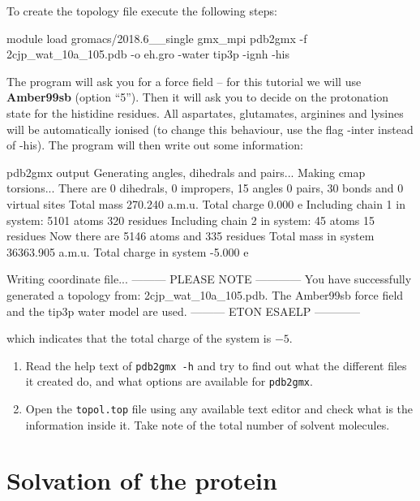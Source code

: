\documentclass[10pt]{article}
\begin{document}
To create the topology file execute the following steps:

\begin{cmdline}
module load gromacs/2018.6__single
gmx_mpi pdb2gmx -f 2cjp_wat_10a_105.pdb -o eh.gro -water tip3p -ignh -his 
\end{cmdline}

The program will ask you for a force field -- for this tutorial we will use \textbf{Amber99sb} (option ``5''). Then it will ask you to decide on the protonation state for the histidine residues. All aspartates, glutamates, arginines and lysines will be automatically ionised (to change this behaviour, use the flag -inter instead of -his). The program will then write out some information:

\begin{script}{pdb2gmx output}
Generating angles, dihedrals and pairs...
Making cmap torsions...
There are    0 dihedrals,    0 impropers,   15 angles
             0 pairs,       30 bonds and     0 virtual sites
Total mass 270.240 a.m.u.
Total charge 0.000 e
Including chain 1 in system: 5101 atoms 320 residues
Including chain 2 in system: 45 atoms 15 residues
Now there are 5146 atoms and 335 residues
Total mass in system 36363.905 a.m.u.
Total charge in system -5.000 e

Writing coordinate file...
		--------- PLEASE NOTE ------------
You have successfully generated a topology from: 2cjp_wat_10a_105.pdb.
The Amber99sb force field and the tip3p water model are used.
		--------- ETON ESAELP ------------
\end{script}

which indicates that the total charge of the system is \(-5\).

\begin{question} 
    \begin{enumerate}[leftmargin=0.6cm]
        \renewcommand{\labelenumi}{Q\arabic{enumi}.}
        \setcounter{enumi}{4}
        \item Read the help text of \texttt{pdb2gmx -h} and try to find out what the different files it created do, and what options are available for \texttt{pdb2gmx}. 
        \item Open the \texttt{topol.top} file using any available text editor and check what is the information inside it. Take note of the total number of solvent molecules. 
    \end{enumerate}
\end{question}


\section{Solvation of the protein}
\end{document}
